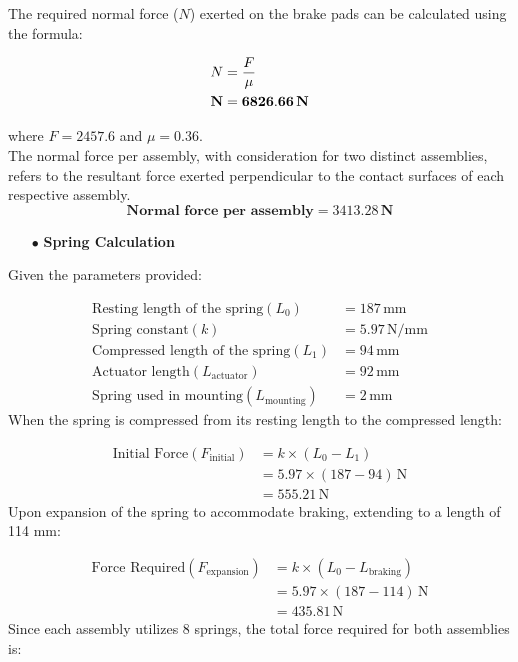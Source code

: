 The required normal force (\( N \)) exerted on the brake pads can be calculated using the formula:

\begin{align}
    N &= \frac{F}{\mu} \notag \\     
  \textbf N  &= \mathbf{6826.66} \, \textbf{N}
\end{align}

where \( F = 2457.6 \) and \( \mu = 0.36 \).\\

The normal force per assembly, with consideration for two distinct assemblies, refers to the resultant force exerted perpendicular to the contact surfaces of each respective assembly.\\

\begin{equation}
\textbf{Normal force per assembly} = \mathbf{3413.28 \,N}
\end{equation}

\newpage
\begin{itemize}[leftmargin=*]
    \item[$\bullet$] \textbf{Spring Calculation}
\end{itemize}
\noindent
Given the parameters provided:

\begin{align*}
    \text{Resting length of the spring} (L_0) &= 187 \, \text{mm} \\
    \text{Spring constant} (k) &= 5.97 \, \text{N/mm} \\
    \text{Compressed length of the spring} (L_1) &= 94 \, \text{mm} \\
    \text{Actuator length} (L_{\text{actuator}}) &= 92 \, \text{mm} \\
    \text{Spring used in mounting} (L_{\text{mounting}}) &= 2 \, \text{mm}
\end{align*}
\noindent
When the spring is compressed from its resting length to the compressed length:

\begin{align*}
    \text{Initial Force} (F_{\text{initial}}) &= k \times (L_0 - L_1) \\
    &= 5.97 \times (187 - 94) \, \text{N} \\
    &= 555.21 \, \text{N}
\end{align*}
\noindent
Upon expansion of the spring to accommodate braking, extending to a length of 114 mm:

\begin{align*}
    \text{Force Required} (F_{\text{expansion}}) &= k \times (L_0 - L_{\text{braking}}) \\
    &= 5.97 \times (187 - 114) \, \text{N} \\
    &= 435.81 \, \text{N}
\end{align*}
\noindent
Since each assembly utilizes 8 springs, the total force required for both assemblies is:

